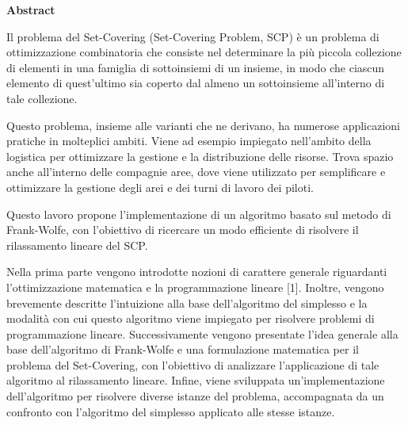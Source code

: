 {
\thispagestyle{empty}
\vspace*{40pt}
\begin{center}
\color{primary}
\fontsize{27pt}{0pt}\bfseries\selectfont\alt Abstract
\vspace*{10pt}
\end{center}
}

\noindent
Il problema del Set-Covering (Set-Covering Problem, SCP) è un problema di ottimizzazione combinatoria che consiste nel
determinare la più piccola collezione di elementi in una famiglia di sottoinsiemi di un insieme, in modo che ciascun
elemento di quest'ultimo sia coperto dal almeno un sottoinsieme all'interno di tale collezione.

Questo problema, insieme alle varianti che ne derivano, ha numerose applicazioni pratiche in molteplici ambiti. Viene ad
esempio impiegato nell'ambito della logistica per ottimizzare la gestione e la distribuzione delle risorse. Trova spazio
anche all'interno delle compagnie aree, dove viene utilizzato per semplificare e ottimizzare la gestione degli arei e
dei turni di lavoro dei piloti.

Questo lavoro propone l'implementazione di un algoritmo basato sul metodo di Frank-Wolfe, con
l'obiettivo di ricercare un modo efficiente di risolvere il rilassamento lineare del SCP.

Nella prima parte vengono introdotte nozioni di carattere generale riguardanti l'ottimizzazione matematica e la
programmazione lineare [1]. Inoltre, vengono brevemente descritte l'intuizione alla base dell'algoritmo del simplesso e la
modalità con cui questo algoritmo viene impiegato per risolvere problemi di programmazione lineare. Successivamente
vengono presentate l'idea generale alla base dell'algoritmo di Frank-Wolfe e una formulazione matematica per il problema
del Set-Covering, con l'obiettivo di analizzare l'applicazione di tale algoritmo al rilassamento lineare.
Infine, viene sviluppata un'implementazione dell'algoritmo per risolvere diverse istanze del problema, accompagnata da
un confronto con l'algoritmo del simplesso applicato alle stesse istanze.
